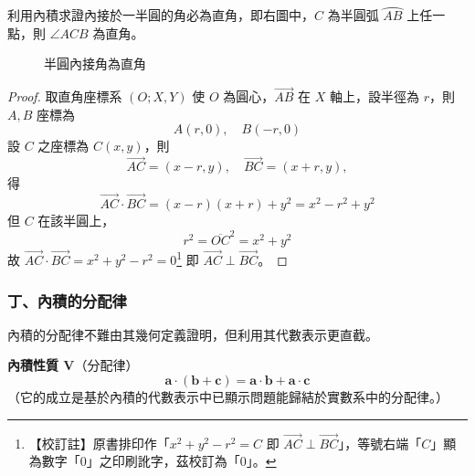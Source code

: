 \begin{example}
利用內積求證內接於一半圓的角必為直角，即右圖中，$C$ 為半圓弧 $\wideparen{AB}$ 上任一點，則 $\angle ACB$ 為直角。
\end{example}

\begin{figure}[H]
\centering
{}
\caption{半圓內接角為直角}
\label{fig:b3s-fig3-41}
\end{figure}

\begin{proof}
取直角座標系 $(O; X, Y)$ 使 $O$ 為圓心，$\vec{AB}$ 在 $X$ 軸上，設半徑為 $r$，則 $A, B$ 座標為
\[ A(r, 0), \quad B(-r, 0) \]
設 $C$ 之座標為 $C(x, y)$，則
\[ \vec{AC} = (x - r, y), \quad \vec{BC} = (x + r, y), \]
得
\[ \vec{AC}\cdot\vec{BC} = (x - r)(x + r) + y^2 = x^2 - r^2 + y^2 \]
但 $C$ 在該半圓上，
\[ r^2 = \overline{OC}^2 = x^2 + y^2 \]
\label{note:b3s-ch3-p116-ac-bc-zero}%
故 $\vec{AC}\cdot\vec{BC} = x^2 + y^2 - r^2 = 0$\footnote{【校訂註】原書排印作「$x^2+y^2-r^2 = C$ 即 $\vec{AC}\perp\vec{BC}$」，等號右端「$C$」顯為數字「$0$」之印刷訛字，茲校訂為「$0$」。} 即 $\vec{AC} \perp \vec{BC}$。\qedhere
\end{proof}

\subsubsection*{丁、內積的分配律}

內積的分配律不難由其幾何定義證明，但利用其代數表示更直截。

\textbf{內積性質 V}（分配律）
\[ \mathbf{a}\cdot(\mathbf{b} + \mathbf{c}) = \mathbf{a}\cdot\mathbf{b} + \mathbf{a}\cdot\mathbf{c} \]
（它的成立是基於內積的代數表示中已顯示問題能歸結於實數系中的分配律。）

